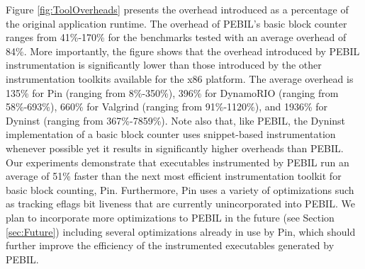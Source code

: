 Figure \ref{fig:ToolOverheads} presents the overhead introduced as a percentage of the original application runtime. The
overhead of PEBIL's basic block counter ranges from 41\%-170\% for the benchmarks tested with an average overhead of 
84\%. More importantly, the figure shows that the overhead introduced by PEBIL instrumentation is significantly 
lower than those introduced by the other instrumentation toolkits available for the x86 platform. 
The average overhead is 135\% for Pin (ranging from 8\%-350\%), 
396\% for DynamoRIO (ranging from 58\%-693\%), 660\% for Valgrind (ranging from 91\%-1120\%), 
and 1936\% for Dyninst (ranging from 367\%-7859\%). Note also that, like PEBIL, the Dyninst
implementation of a basic block counter uses snippet-based instrumentation whenever possible yet
it results in significantly higher overheads than PEBIL.
Our experiments demonstrate that executables instrumented by PEBIL run an average of
51\% faster than the next most efficient instrumentation toolkit for basic block counting, Pin. Furthermore,
Pin uses a variety of optimizations such as tracking eflags bit liveness \cite{luk2005pin} that are currently
unincorporated into PEBIL. We plan to incorporate more optimizations to PEBIL in the future (see Section \ref{sec:Future}) including
several optimizations already in use by Pin, which should further improve the efficiency of the instrumented
executables generated by PEBIL.


